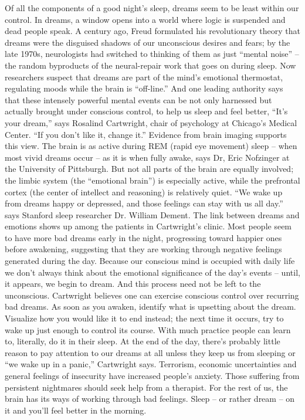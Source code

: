 Of all the components of a good night’s sleep, dreams seem to be least within our control. In dreams, a window opens into a world where logic is suspended and dead people speak. A century ago, Freud formulated his revolutionary theory that dreams were the disguised shadows of our unconscious desires and fears; by the late 1970s, neurologists had switched to thinking of them as just “mental noise” -- the random byproducts of the neural-repair work that goes on during sleep. Now researchers suspect that dreams are part of the mind’s emotional thermostat, regulating moods while the brain is “off-line.” And one leading authority says that these intensely powerful mental events can be not only harnessed but actually brought under conscious control, to help us sleep and feel better, “It’s your dream,” says Rosalind Cartwright, chair of psychology at Chicago’s Medical Center. “If you don’t like it, change it.”
Evidence from brain imaging supports this view. The brain is as active during REM (rapid eye movement) sleep -- when most vivid dreams occur -- as it is when fully awake, says Dr, Eric Nofzinger at the University of Pittsburgh. But not all parts of the brain are equally involved; the limbic system (the “emotional brain”) is especially active, while the prefrontal cortex (the center of intellect and reasoning) is relatively quiet. “We wake up from dreams happy or depressed, and those feelings can stay with us all day.” says Stanford sleep researcher Dr. William Dement.
The link between dreams and emotions shows up among the patients in Cartwright’s clinic. Most people seem to have more bad dreams early in the night, progressing toward happier ones before awakening, suggesting that they are working through negative feelings generated during the day. Because our conscious mind is occupied with daily life we don’t always think about the emotional significance of the day’s events -- until, it appears, we begin to dream.
And this process need not be left to the unconscious. Cartwright believes one can exercise conscious control over recurring bad dreams. As soon as you awaken, identify what is upsetting about the dream. Visualize how you would like it to end instead; the next time it occurs, try to wake up just enough to control its course. With much practice people can learn to, literally, do it in their sleep.
At the end of the day, there’s probably little reason to pay attention to our dreams at all unless they keep us from sleeping or “we wake up in a panic,” Cartwright says. Terrorism, economic uncertainties and general feelings of insecurity have increased people’s anxiety. Those suffering from persistent nightmares should seek help from a therapist. For the rest of us, the brain has its ways of working through bad feelings. Sleep -- or rather dream -- on it and you’ll feel better in the morning.

